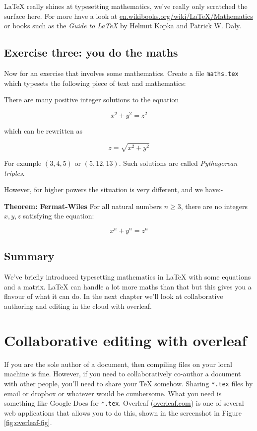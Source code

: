 \documentclass[
]{book}
\begin{document}
LaTeX really shines at typesetting mathematics, we've really only scratched the surface here. For more have a look at
\href{https://en.wikibooks.org/wiki/LaTeX/Mathematics}{en.wikibooks.org/wiki/LaTeX/Mathematics} or books such as the \emph{Guide to LaTeX} by Helmut Kopka and Patrick W. Daly. \citep{kopka}

\hypertarget{ex3}{%
\section{Exercise three: you do the maths}\label{ex3}}

Now for an exercise that involves some mathematics. Create a file \texttt{maths.tex} which typesets the following piece of text and mathematics:

There are many positive integer solutions to the equation

\[ x^2 + y^2 =  z^2 \]

which can be rewritten as

\[ z = \sqrt{x^2 + y^2} \]

For example \((3,4, 5)\) or \((5,12,13)\). Such solutions are called \emph{Pythagorean triples}.

However, for higher powers the situation is very different, and we have:-

\textbf{Theorem: Fermat-Wiles}
For all natural numbers \(n ≥ 3\), there are no integers \(x,y,z\) satisfying the equation:

\[ x^n + y^n = z^n \]

\hypertarget{mathconc}{%
\section{Summary}\label{mathconc}}

We've briefly introduced typesetting mathematics in LaTeX with some equations and a matrix. LaTeX can handle a lot more maths than that but this gives you a flavour of what it can do. In the next chapter we'll look at collaborative authoring and editing in the cloud with overleaf.

\hypertarget{overleaf}{%
\chapter{Collaborative editing with overleaf}\label{overleaf}}

If you are the sole author of a document, then compiling files on your local machine is fine. However, if you need to collaboratively co-author a document with other people, you'll need to share your TeX somehow. Sharing \texttt{*.tex} files by email or dropbox or whatever would be cumbersome. What you need is something like Google Docs for \texttt{*.tex}. Overleaf (\href{https://www.overleaf.com/}{overleaf.com}) is one of several web applications that allows you to do this, shown in the screenshot in Figure \ref{fig:overleaf-fig}.
\end{document}
